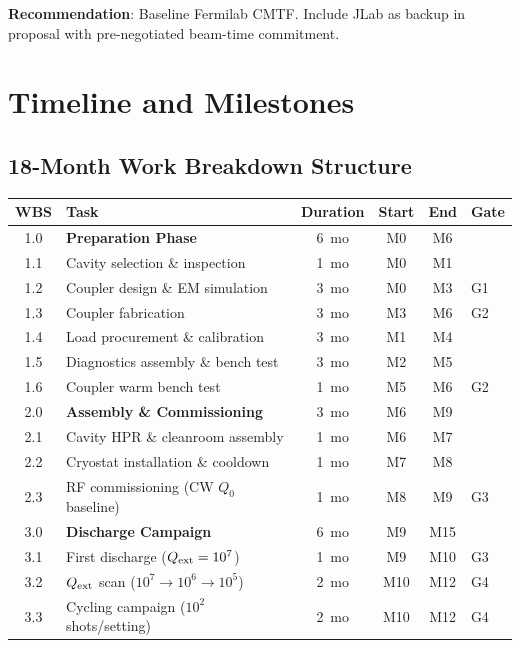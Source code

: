 \documentclass[11pt]{article}
\newcommand{\Qext}{Q_{\rm ext}}
\newcommand{\Qzero}{Q_0}
\begin{document}
\textbf{Recommendation}: Baseline Fermilab CMTF. Include JLab as
backup in proposal with pre-negotiated beam-time commitment.

\section{Timeline and Milestones}
\label{sec:timeline}

\subsection{18-Month Work Breakdown Structure}

\begin{center}
\small
\begin{tabular}{clcccl}
\toprule
WBS & Task & Duration & Start & End & Gate \\
\midrule
1.0 & \textbf{Preparation Phase} & 6~mo & M0 & M6 & \\
1.1 & Cavity selection \& inspection & 1~mo & M0 & M1 & \\
1.2 & Coupler design \& EM simulation & 3~mo & M0 & M3 & G1 \\
1.3 & Coupler fabrication & 3~mo & M3 & M6 & G2 \\
1.4 & Load procurement \& calibration & 3~mo & M1 & M4 & \\
1.5 & Diagnostics assembly \& bench test & 3~mo & M2 & M5 & \\
1.6 & Coupler warm bench test & 1~mo & M5 & M6 & G2 \\
\midrule
2.0 & \textbf{Assembly \& Commissioning} & 3~mo & M6 & M9 & \\
2.1 & Cavity HPR \& cleanroom assembly & 1~mo & M6 & M7 & \\
2.2 & Cryostat installation \& cooldown & 1~mo & M7 & M8 & \\
2.3 & RF commissioning (CW $\Qzero$ baseline) & 1~mo & M8 & M9 & G3 \\
\midrule
3.0 & \textbf{Discharge Campaign} & 6~mo & M9 & M15 & \\
3.1 & First discharge ($\Qext = 10^7$) & 1~mo & M9 & M10 & G3 \\
3.2 & $\Qext$ scan ($10^7 \to 10^6 \to 10^5$) & 2~mo & M10 & M12 & G4 \\
3.3 & Cycling campaign ($10^2$ shots/setting) & 2~mo & M10 & M12 & G4 \\

\end{tabular}
\end{center}
\end{document}
